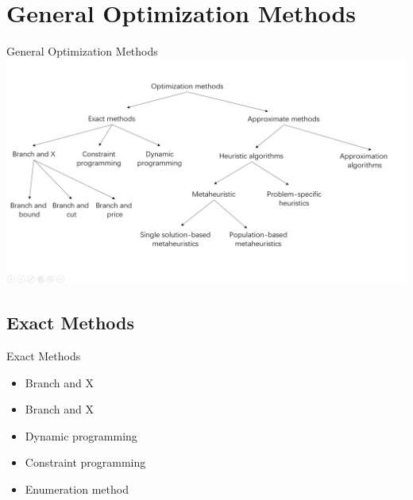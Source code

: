 \section{General Optimization Methods}

    \begin{frame}{General Optimization Methods}
        \centering
        \includegraphics[width = 1\textwidth]{images/opt.png}
    \end{frame}

    \subsection{Exact Methods}
    \frame{\sectionpage}

    \begin{frame}{Exact Methods}
      \begin{itemize}
        \item<+> Branch and X
      \end{itemize}
      
      \begin{itemize}
        \item Branch and X
        \item<+-> Dynamic programming
        \item<+-> Constraint programming
        \item<+-> Enumeration method
      \end{itemize}
    \end{frame}


